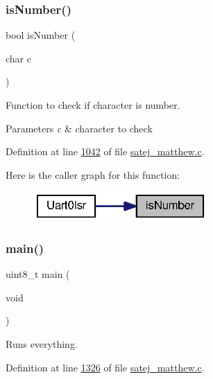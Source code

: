 \subsubsection{\texorpdfstring{isNumber()}{isNumber()}}
{\footnotesize\ttfamily bool is\+Number (\begin{DoxyParamCaption}\item[{char}]{c }\end{DoxyParamCaption})}



Function to check if character is number. 


\begin{DoxyParams}{Parameters}
{\em c} & character to check \\
\hline
\end{DoxyParams}


Definition at line \mbox{\hyperlink{satej__matthew_8c_source_l01042}{1042}} of file \mbox{\hyperlink{satej__matthew_8c_source}{satej\+\_\+matthew.\+c}}.

Here is the caller graph for this function\+:
\nopagebreak
\begin{figure}[H]
\begin{center}
\leavevmode
\includegraphics[width=188pt]{satej__matthew_8c_a65b1640156c68ea7687a41428022c1d8_icgraph}
\end{center}
\end{figure}
\mbox{\label{satej__matthew_8c_a922afd31fa147cb51a9b28ce18b3e30e}} 
\subsubsection{\texorpdfstring{main()}{main()}}
{\footnotesize\ttfamily uint8\+\_\+t main (\begin{DoxyParamCaption}\item[{void}]{ }\end{DoxyParamCaption})}



Runs everything. 



Definition at line \mbox{\hyperlink{satej__matthew_8c_source_l01326}{1326}} of file \mbox{\hyperlink{satej__matthew_8c_source}{satej\+\_\+matthew.\+c}}.

